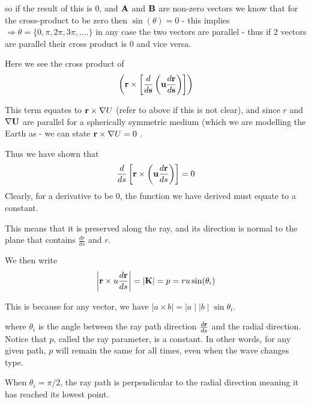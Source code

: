 \documentclass{mm2}
\begin{document}
\begin{answer}{3}
so if the result of this is 0, and ${\bf A}$ and ${\bf B}$ are non-zero vectors we know that for the cross-product to be zero then $\sin(\theta) = 0$ - this implies $\Longrightarrow \theta = \{0, \pi, 2\pi, 3\pi, ....\}$ in any case the two vectors are parallel - thus if 2 vectors are parallel their cross product is 0 and vice versa.


 Here we see the cross product of 
\begin{eqnarray}
\left( {\bf r} \times \left[\frac{d}{d{\bf s}}\left({\bf u}\frac{d {\bf r}}{d {\bf s}} \right) \right]  \right)
\end{eqnarray}

This term equates to ${\bf r} \times {\bf \nabla} U$  (refer to above if this is not clear), and since $r$ and ${\bf \nabla U}$ are parallel for a spherically symmetric medium (which we are modelling the Earth as - we can state ${\bf r} \times {\bf \nabla} U = 0$ .

Thus we have shown that 
\begin{eqnarray}
\frac{d}{ds} \left[ {\bf r} \times \left({\bf u} \frac{d{\bf r}}{ds} \right) \right]  = 0
\end{eqnarray}
 Clearly, for a derivative to be 0, the function we have derived must equate to a constant.
\end{answer}

This means that it is preserved along the ray, and its direction is normal to the plane that contains $\frac{dr}{ds}$ and $r$.

We then write
\begin{eqnarray}
\left|{\bf r} \times u \frac{d{\bf r}}{ds}\right|=|{\bf K}| = p = 
r u \sin(\theta_i)
\label{eq_ray4}
\end{eqnarray}


This is because for any vector, we have $\mid a \times b \mid = \mid a \mid \mid b \mid \sin \theta_i$.

where $\theta_i$ is the angle between the ray path 
direction $\frac{d{\bf r}}{ds}$ and the radial direction. 
Notice that $p$, called the ray parameter, is a constant. In other words, 
for any given path, $p$ will remain the same for all times, even when the
wave changes type.

When $\theta_i=\pi/2$, the ray path is 
perpendicular to the radial direction meaning it has reached its lowest point.
\end{document}
